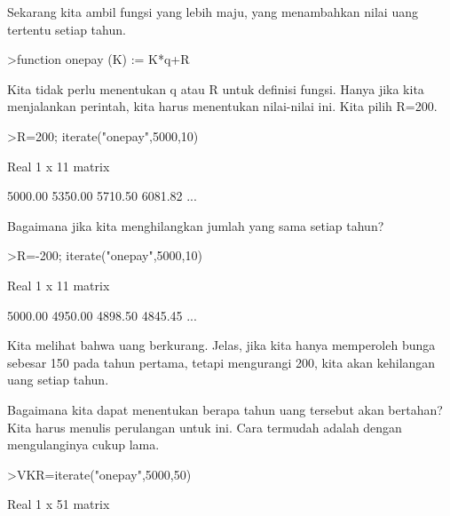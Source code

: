 \documentclass[a4paper,10pt]{article}
\begin{document}
\begin{eulernotebook}
\begin{eulercomment}
\begin{eulercomment}
\begin{eulercomment}
\begin{eulercomment}
\begin{eulercomment}
\begin{eulercomment}
\begin{eulercomment}
\begin{eulercomment}
\begin{eulercomment}
Sekarang kita ambil fungsi yang lebih maju, yang menambahkan nilai
uang tertentu setiap tahun.
\end{eulercomment}
\begin{eulerprompt}
>function onepay (K) := K*q+R
\end{eulerprompt}
\begin{eulercomment}
Kita tidak perlu menentukan q atau R untuk definisi fungsi. Hanya jika
kita menjalankan perintah, kita harus menentukan nilai-nilai ini. Kita
pilih R=200.
\end{eulercomment}
\begin{eulerprompt}
>R=200; iterate("onepay",5000,10)
\end{eulerprompt}
\begin{euleroutput}
  Real 1 x 11 matrix
  
      5000.00     5350.00     5710.50     6081.82     ...
\end{euleroutput}
\begin{eulercomment}
Bagaimana jika kita menghilangkan jumlah yang sama setiap tahun?
\end{eulercomment}
\begin{eulerprompt}
>R=-200; iterate("onepay",5000,10)
\end{eulerprompt}
\begin{euleroutput}
  Real 1 x 11 matrix
  
      5000.00     4950.00     4898.50     4845.45     ...
\end{euleroutput}
\begin{eulercomment}
Kita melihat bahwa uang berkurang. Jelas, jika kita hanya memperoleh
bunga sebesar 150 pada tahun pertama, tetapi mengurangi 200, kita akan
kehilangan uang setiap tahun.

Bagaimana kita dapat menentukan berapa tahun uang tersebut akan
bertahan? Kita harus menulis perulangan untuk ini. Cara termudah
adalah dengan mengulanginya cukup lama.
\end{eulercomment}
\begin{eulerprompt}
>VKR=iterate("onepay",5000,50)
\end{eulerprompt}
\begin{euleroutput}
  Real 1 x 51 matrix
  

\end{euleroutput}
\end{eulercomment}
\end{eulercomment}
\end{eulercomment}
\end{eulercomment}
\end{eulercomment}
\end{eulercomment}
\end{eulercomment}
\end{eulercomment}
\end{eulernotebook}
\end{document}
